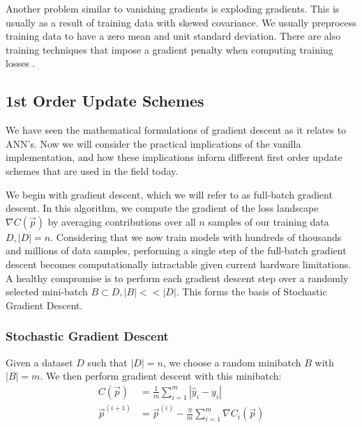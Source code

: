 \documentclass[paper=a4, fontsize=12pt]{scrartcl} %
\numberwithin{equation}{section} %
\numberwithin{figure}{section} %
\numberwithin{table}{section} %
\begin{document}
Another problem similar to vanishing gradients is exploding gradients. This is usually as a result of training data with skewed covariance. We usually preprocess 
training data to have a zero mean and unit standard deviation. There are also training techniques that impose a gradient penalty when computing training losses \cite{wgangp}.


\subsection{1st Order Update Schemes}

We have seen the mathematical formulations of gradient descent as it relates to ANN's. Now we will consider the practical implications of the vanilla implementation, and how
these implications inform different first order update schemes that are used in the field today.

We begin with gradient descent, which we will refer to as full-batch gradient descent. In this algorithm, we compute the gradient of the loss landscape $\nabla C(\vec{p})$ by averaging 
contributions over all $n$ samples of our training data $D, |D| = n$. Considering that we now train models with hundreds of thousands and millions of data samples, performing 
a single step of the full-batch gradient descent becomes computationally intractable given current hardware limitations. A healthy compromise is to perform each gradient descent step
over a randomly selected mini-batch $B \subset D, |B| << |D|$. This forms the basis of Stochastic Gradient Descent.

\subsubsection{Stochastic Gradient Descent}

Given a dataset $D$ such that $|D| = n$, we choose a random minibatch $B$ with $|B| = m$. We then perform gradient descent with this minibatch:
\begin{align*}
    C(\vec{p}) &= \frac{1}{m} \sum_{i=1}^m |\hat{y}_i - y_i| \\
    \vec{p}^{(i+1)} &= \vec{p}^{(i)} - \frac{\eta}{m} \sum_{i=1}^m \nabla C_i(\vec{p})
\end{align*}
\end{document}
